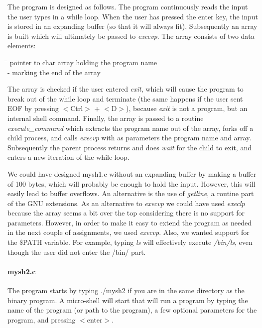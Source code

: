 \documentclass[a4paper,10pt]{article}
\begin{document}
The program is designed as follows. The program continuously reads the input the user types in a while loop. When the user has pressed the enter key, the input is stored in an expanding buffer (so that it will always fit). Subsequently an array is built which will ultimately be passed to \emph{execvp}. The array consists of two data elements:
\begin{tabbing}
\hspace{20pt}\=\kill
 \> [0] pointer to char array holding the program name\\ 
  - marking the end of the array
\end{tabbing}
The array is checked if the user entered \emph{exit}, which will cause the program to break out of the while loop and terminate (the same happens if the user sent EOF by pressing $<$Ctrl$>$ + $<$D$>$), because \emph{exit} is not a program, but an internal shell command. Finally, the array is passed to a routine \emph{execute\_command} which extracts the program name out of the array, forks off a child process, and calls \emph{execvp} with as parameters the program name and array. Subsequently the parent process returns and does \emph{wait} for the child to exit, and enters a new iteration of the while loop.

We could have designed mysh1.c without an expanding buffer by making a buffer of 100 bytes, which will probably be enough to hold the input. However, this will easily lead to buffer overflows. An alternative is the use of \emph{getline}, a routine part of the GNU extensions. As an alternative to \emph{execvp} we could have used \emph{execlp} because the array seems a bit over the top considering there is no support for parameters. However, in order to make it easy to extend the program as needed in the next couple of assignments, we used \emph{execvp}. Also, we wanted support for the \$PATH variable. For example, typing \emph{ls} will effectively execute \emph{/bin/ls}, even though the user did not enter the /bin/ part.

\paragraph{mysh2.c} The program starts by typing ./mysh2 if you are in the same directory as the binary program. A micro-shell will start that will run a program by typing the name of the program (or path to the program), a few optional parameters for the program, and pressing $<$enter$>$.
\end{document}
